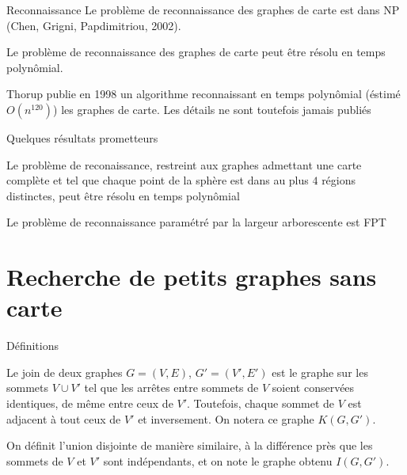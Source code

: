 \documentclass{beamer}
\begin{document}
\begin{frame}{Reconnaissance}
    Le problème de reconnaissance des graphes de carte est dans NP (Chen, Grigni, Papdimitriou, 2002).

    \begin{conj}
        Le problème de reconnaissance des graphes de carte peut être résolu en temps polynômial.
    \end{conj}

    Thorup publie en 1998 un algorithme reconnaissant en temps polynômial (éstimé $O(n^{120})$) les graphes
    de carte. Les détails ne sont toutefois jamais publiés
\end{frame}

\begin{frame}{Quelques résultats prometteurs}
    \begin{thm}
        Le problème de reconaissance, restreint aux graphes admettant une carte complète et tel que chaque point
        de la sphère est dans au plus $4$ régions distinctes, peut être résolu en temps polynômial
    \end{thm}

    \begin{thm}
        Le problème de reconnaissance paramétré par la largeur arborescente est FPT
    \end{thm}
\end{frame}

\section{Recherche de petits graphes sans carte}

\begin{frame}{Définitions}
    \begin{definition}[Join]
        Le join de deux graphes $G = (V, E)$, $G' = (V', E')$ est le graphe sur les sommets $V \cup V'$ tel
        que les arrêtes entre sommets de $V$ soient conservées identiques, de même entre ceux de $V'$. Toutefois,
        chaque sommet de $V$ est adjacent à tout ceux de $V'$ et inversement. On notera ce graphe $K(G, G')$.
    \end{definition}
    \begin{definition}
        On définit l'union disjointe de manière similaire, à la différence près que les sommets de $V$ et $V'$ sont
        indépendants, et on note le graphe obtenu $I(G, G')$.
    \end{definition}
\end{frame}
\end{document}
